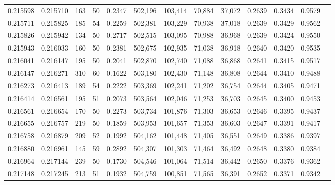 \begin{tabular}{rrrrrrrrrrrrr}
0.215598 & 0.215710 &   163 &  50 &                                     0.2347 & 502,196 & 103,414 &  70,884 &  37,072 & 0.2639 & 0.3434 & 0.9579 \\
0.215711 & 0.215825 &   185 &  54 &                                     0.2259 & 502,381 & 103,229 &  70,938 &  37,018 & 0.2639 & 0.3429 & 0.9562 \\
0.215826 & 0.215942 &   134 &  50 &                                     0.2717 & 502,515 & 103,095 &  70,988 &  36,968 & 0.2639 & 0.3424 & 0.9550 \\
0.215943 & 0.216033 &   160 &  50 &                                     0.2381 & 502,675 & 102,935 &  71,038 &  36,918 & 0.2640 & 0.3420 & 0.9535 \\
0.216041 & 0.216147 &   195 &  50 &                                     0.2041 & 502,870 & 102,740 &  71,088 &  36,868 & 0.2641 & 0.3415 & 0.9517 \\
0.216147 & 0.216271 &   310 &  60 &                                     0.1622 & 503,180 & 102,430 &  71,148 &  36,808 & 0.2644 & 0.3410 & 0.9488 \\
0.216273 & 0.216413 &   189 &  54 &                                     0.2222 & 503,369 & 102,241 &  71,202 &  36,754 & 0.2644 & 0.3405 & 0.9471 \\
0.216414 & 0.216561 &   195 &  51 &                                     0.2073 & 503,564 & 102,046 &  71,253 &  36,703 & 0.2645 & 0.3400 & 0.9453 \\
0.216561 & 0.216654 &   170 &  50 &                                     0.2273 & 503,734 & 101,876 &  71,303 &  36,653 & 0.2646 & 0.3395 & 0.9437 \\
0.216655 & 0.216757 &   219 &  50 &                                     0.1859 & 503,953 & 101,657 &  71,353 &  36,603 & 0.2647 & 0.3391 & 0.9417 \\
0.216758 & 0.216879 &   209 &  52 &                                     0.1992 & 504,162 & 101,448 &  71,405 &  36,551 & 0.2649 & 0.3386 & 0.9397 \\
0.216880 & 0.216961 &   145 &  59 &                                     0.2892 & 504,307 & 101,303 &  71,464 &  36,492 & 0.2648 & 0.3380 & 0.9384 \\
0.216964 & 0.217144 &   239 &  50 &                                     0.1730 & 504,546 & 101,064 &  71,514 &  36,442 & 0.2650 & 0.3376 & 0.9362 \\
0.217148 & 0.217245 &   213 &  51 &                                     0.1932 & 504,759 & 100,851 &  71,565 &  36,391 & 0.2652 & 0.3371 & 0.9342 \\

\end{tabular}
